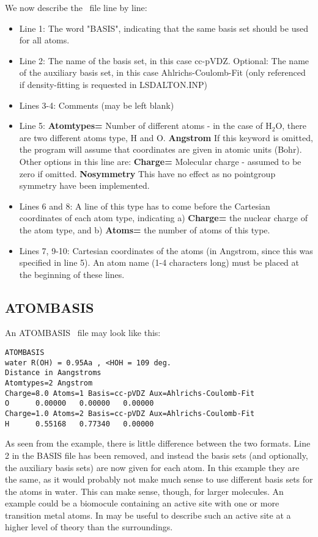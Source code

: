 We now describe the \mol\ file line by line:
\begin{itemize}
\item Line 1: The word "BASIS", indicating that the same basis set should be used for all 
atoms.
\item Line 2: The name of the basis set, in this case cc-pVDZ. Optional: The name
of the auxiliary basis set, in this case Ahlrichs-Coulomb-Fit
(only referenced if density-fitting is requested in LSDALTON.INP)
\item Lines 3-4: Comments (may be left blank)
\item Line 5: {\bf Atomtypes=} Number of different atoms - in the case of H$_2$O, there are two different
atoms type, H and O. {\bf Angstrom} If this keyword is omitted, the program will assume that coordinates
are given in atomic units (Bohr). Other options in this line are:
{\bf Charge=} Molecular charge - assumed to be zero if omitted. 
{\bf Nosymmetry} This have no effect as no pointgroup symmetry have been implemented. 
\item Lines 6 and 8: A line of this type has to come before the Cartesian coordinates of each atom
type, indicating a) {\bf Charge=} the nuclear charge of the atom type, and b) {\bf Atoms=} the number of atoms of this type.
\item Lines 7, 9-10: Cartesian coordinates of the atoms (in Angstrom, since this was specified 
in line 5). An atom name (1-4 characters long) must be placed at the beginning of these lines.
\end{itemize}

\subsection{ATOMBASIS}

An ATOMBASIS \mol\ file may look like this:
\begin{verbatim}
ATOMBASIS
water R(OH) = 0.95Aa , <HOH = 109 deg.
Distance in Aangstroms
Atomtypes=2 Angstrom
Charge=8.0 Atoms=1 Basis=cc-pVDZ Aux=Ahlrichs-Coulomb-Fit
O      0.00000   0.00000   0.00000
Charge=1.0 Atoms=2 Basis=cc-pVDZ Aux=Ahlrichs-Coulomb-Fit
H      0.55168   0.77340   0.00000
\end{verbatim} 
As seen from the example, there is little difference between the two
formats. Line 2 in the BASIS file has been removed, and instead the basis
sets (and optionally, the auxiliary basis sets) are now given for each
atom. In this example they are the same, as it would probably not make
much sense to use different basis sets for the atoms in water. This can
make sense, though, for larger molecules. An example could be a biomocule containing
an active site with one or more transition metal atoms. In may be useful to
describe such an active site at a higher level of theory than the surroundings. 

